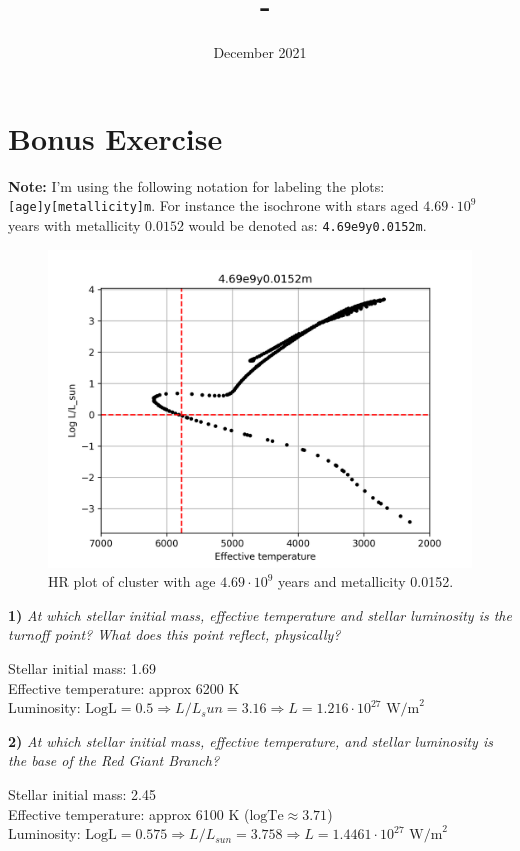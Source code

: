 \documentclass[11pt,a4paper]{article}
\date{December 2021} %
\title{\Foursename\, -\, \Fassignment}
\author{\Fauthor}
\newcommand{\Fassignment}{Bonus Exercise} %
\begin{document}
    
    \clearpage
    \section*{\Fassignment}

    \textbf{Note:} I'm using the following notation for labeling the plots: \texttt{[age]y[metallicity]m}.
    For instance the isochrone with stars aged $4.69 \cdot 10^9$ years with metallicity $0.0152$ would be denoted as: \texttt{4.69e9y0.0152m}.

    \begin{figure}[h]
        \centering
        \includegraphics[width=12cm]{figures/4.69e9y0.0152m}
        \caption{HR plot of cluster with age $4.69 \cdot 10^{9}$ years and metallicity 0.0152.}
        \label{fig:ogHR}
    \end{figure}

    \textbf{1)} \textit{At which stellar initial mass, effective temperature and stellar luminosity is the turnoff point? What does this point reflect, physically?}

    Stellar initial mass: 1.69\\
    Effective temperature: approx 6200 K\\
    Luminosity: $\textrm{LogL} = 0.5 \Rightarrow L/L_sun = 3.16 \Rightarrow L = 1.216 \cdot 10^{27} \textrm{ W/m}^2$
    
    \textbf{2)} \textit{At which stellar initial mass, effective temperature, and stellar luminosity is the base of the Red Giant Branch?}

    Stellar initial mass: 2.45 \\
    Effective temperature: approx 6100 K ($\textrm{logTe} \approx 3.71$) \\
    Luminosity: $\textrm{LogL} = 0.575 \Rightarrow L/L_{sun} = 3.758 \Rightarrow L = 1.4461 \cdot 10^{27} \textrm{ W/m}^2$
    
\end{document}
